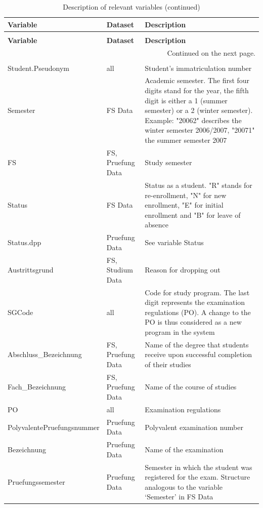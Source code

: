 \documentclass[11pt,a4paper]{article}
\begin{document}
\begin{longtable}{l|l|p{6cm}}
\caption{Description of relevant variables} \\
\hline
\textbf{Variable} & \textbf{Dataset} & \textbf{Description}    \\
\hline
\endfirsthead %
\caption{Description of relevant variables (continued)}\\
\hline
\textbf{Variable} & \textbf{Dataset} & \textbf{Description}    \\
\hline
\endhead %
\multicolumn{3}{r}{Continued on the next page.}\\
\endfoot
\hline
\multicolumn{3}{r}{End of table.} \\
\endlastfoot
Student.Pseudonym & all & Student’s immatriculation number \\
\hline
Semester & FS Data & Academic semester. The first four digits stand for the year, the fifth digit is either a 1 (summer semester) or a 2 (winter semester). Example: "20062" describes the winter semester 2006/2007, "20071" the summer semester 2007 \\
\hline
FS & FS, Pruefung Data & Study semester \\
\hline
Status & FS Data & Status as a student. "R" stands for re-enrollment, "N" for new enrollment, "E" for initial enrollment and "B" for leave of absence \\
\hline
Status.dpp & Pruefung Data & See variable Status \\
\hline
Austrittsgrund & FS, Studium Data & Reason for dropping out \\
\hline
SGCode & all & Code for study program. The last digit represents the examination regulations (PO). A change to the PO is thus considered as a new program in the system \\
\hline
Abschluss\_Bezeichnung & FS, Pruefung Data & Name of the degree that students receive upon successful completion of their studies \\
\hline
Fach\_Bezeichnung & FS, Pruefung Data & Name of the course of studies \\
\hline
PO & all & Examination regulations \\
\hline
PolyvalentePruefungsnummer & Pruefung Data & Polyvalent examination number \\
\hline
Bezeichnung & Pruefung Data & Name of the examination \\
\hline
Pruefungssemester & Pruefung Data & Semester in which the student was registered for the exam. Structure analogous to the variable ‘Semester’ in FS Data \\

\end{longtable}
\end{document}
